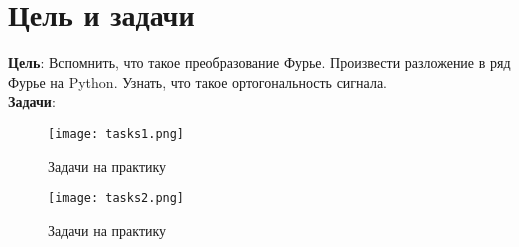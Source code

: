 \chapter*{Цель и задачи}
\label{ch:intro}

\textbf{Цель}: Вспомнить, что такое преобразование Фурье. Произвести разложение в ряд Фурье на Python. Узнать, что такое
ортогональность сигнала.
\\\textbf{Задачи}: \\

\begin{figure}[ht]
    \centering
    \texttt{[image: tasks1.png]}
    \caption{Задачи на практику}
\end{figure}

\begin{figure}[ht]
    \centering
    \texttt{[image: tasks2.png]}
    \caption{Задачи на практику}
\end{figure}

\endinput